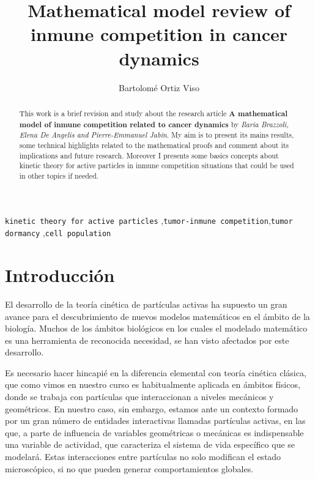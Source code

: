 \documentclass[1p]{elsarticle}
\begin{document}
\begin{frontmatter}

\title{Mathematical model review of inmune competition in cancer dynamics}

\author{Bartolomé Ortiz Viso}
\address{EDP de transporte\\Máster en Física y Matemáticas\\ Universidad de Granada\\17/01/2018}

\begin{abstract}
This work is a brief revision and study about the research article  \textbf{A mathematical model of inmune competition related to cancer dynamics}\cite{original} by \textit{Ilaria Brazzoli, Elena De Angelis and Pierre-Emmanuel Jabin}. My aim is to present its mains results, some technical highlights related to the mathematical proofs and comment about its implications and future research. Moreover I presents some basics concepts about kinetic theory for active particles in inmune competition situations that could be used in other topics if needed.
\end{abstract}

\begin{keyword}
 \texttt{kinetic theory for active particles} \sep \texttt{tumor-inmune competition}\sep \texttt{tumor dormancy} \sep \texttt{cell population}

\end{keyword}

\end{frontmatter}

\linenumbers

\section{Introducción}
 El desarrollo de la teoría cinética de partículas activas ha supuesto un gran avance para el descubrimiento de nuevos modelos matemáticos en el ámbito de la biología. Muchos de los ámbitos biológicos en los cuales el modelado matemático es una herramienta de reconocida necesidad, se han visto afectados por este desarrollo.


 Es necesario hacer hincapié en la diferencia elemental con teoría cinética clásica, que como vimos en nuestro curso es habitualmente aplicada en ámbitos físicos, donde se trabaja con partículas que interaccionan a niveles mecánicos y geométricos. En nuestro caso, sin embargo, estamos ante un contexto formado por un gran número de entidades interactivas llamadas partículas activas, en las que, a parte de influencia de variables geométricas o mecánicas es indispensable una variable de actividad, que caracteriza el sistema de vida específico que se modelará. Estas interacciones entre partículas no solo modifican el estado microscópico, si no que pueden generar comportamientos globales.
\end{document}
